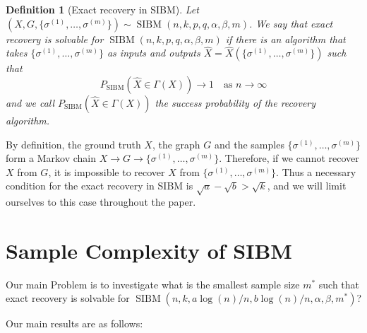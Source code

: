 \documentclass[conference]{IEEEtran}
\newtheorem{definition}{Definition}%
\DeclareMathOperator{\SIBM}{SIBM}
\begin{document}
\begin{definition}[Exact recovery in SIBM]
Let $(X,G,\{\sigma^{(1)},\dots,\sigma^{(m)}\}) \sim \SIBM(n,k,p,q,\alpha,\beta,m)$.
We say that exact recovery is solvable for $\SIBM(n,k,p,q,\alpha,\beta,m)$ if there is an algorithm that takes $\{\sigma^{(1)},\dots,\sigma^{(m)}\}$ as inputs and outputs $\hat{X}=\hat{X}(\{\sigma^{(1)},\dots,\sigma^{(m)}\})$ such that
$$
P_{\SIBM}(\hat{X} \in \Gamma(X)) \to 1
\text{~~~as~} n\to\infty
$$
and we call $P_{\SIBM}(\hat{X} \in \Gamma(X))$ the success probability of the recovery algorithm.
\end{definition}

By definition, the ground truth $X$, the graph $G$ and the samples $\{\sigma^{(1)},\dots,\sigma^{(m)}\}$ form a Markov chain $X\to G\to \{\sigma^{(1)},\dots,\sigma^{(m)}\}$. Therefore, if we cannot recover $X$ from $G$, it is impossible to recover $X$ from $\{\sigma^{(1)},\dots,\sigma^{(m)}\}$. Thus a necessary condition for the exact recovery in SIBM is $\sqrt{a}-\sqrt{b}> \sqrt{k}$, and we will limit ourselves to this case throughout the paper.

\section{Sample Complexity of SIBM}\label{s:trans}
Our main Problem is to investigate what is the smallest sample size $m^\ast$ such that exact recovery is solvable for $\SIBM(n,k, a\log(n)/n, b\log(n)/n,\alpha,\beta,m^\ast)$?

Our main results are as follows:
\end{document}
